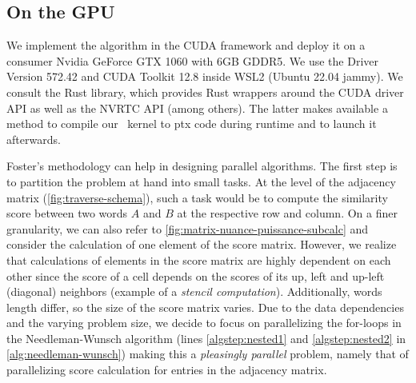 \subsection{On the GPU}

We implement the algorithm in the CUDA framework and deploy it on a consumer Nvidia GeForce GTX 1060 with 6GB GDDR5. We use the Driver Version 572.42 and CUDA Toolkit 12.8 inside WSL2 (Ubuntu 22.04 jammy). We consult the  Rust library, which provides Rust wrappers around the CUDA driver API as well as the NVRTC API (among others). The latter makes available a method to compile our \Cpp~kernel to \gls{ptx} code during runtime and to launch it afterwards.

Foster's methodology can help in designing parallel algorithms. The first step is to partition the problem at hand into small tasks. At the level of the adjacency matrix (\autoref{fig:traverse-schema}), such a task would be to compute the similarity score between two words $A$ and $B$ at the respective row and column. On a finer granularity, we can also refer to \autoref{fig:matrix-nuance-puissance-subcalc} and consider the calculation of one element of the score matrix. However, we realize that calculations of elements in the score matrix are highly dependent on each other since the score of a cell depends on the scores of its up, left and up-left (diagonal) neighbors (example of a \textit{stencil computation}). Additionally, words length differ, so the size of the score matrix varies. Due to the data dependencies and the varying problem size, we decide to focus on parallelizing the for-loops in the Needleman-Wunsch algorithm (lines \ref{algstep:nested1} and \ref{algstep:nested2} in \autoref{alg:needleman-wunsch}) making this a \textit{pleasingly parallel} problem, namely that of parallelizing score calculation for entries in the adjacency matrix.

